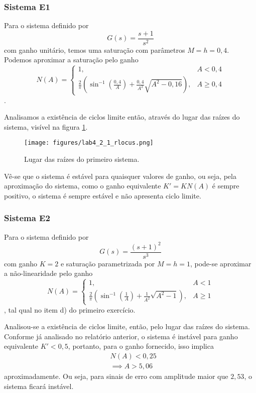\documentclass[a4paper]{report}
\begin{document}

\subsubsection*{Sistema E1}

Para o sistema definido por \[
    G(s) = \frac{s+1}{s^2}
\] com ganho unitário, temos uma saturação com parâmetros $M=h=0,4$. Podemos aproximar a saturação pelo ganho \[
    N(A) = \begin{cases}
	1,& A<0,4 \\
	\frac{2}{\pi}\left( \sin^{-1}\left( \frac{0,4}{A} \right) + \frac{0,4}{A^2}\sqrt{A^2 - 0,16}  \right),& A\ge 0,4
    \end{cases}
\].

Analisamos a existência de ciclos limite então, através do lugar das raízes do sistema, visível na figura \ref{fig:figures-lab4_2_1_rlocus-png}.

\begin{figure}[H]
    \centering
    \texttt{[image: figures/lab4\_2\_1\_rlocus.png]}
    \caption{Lugar das raízes do primeiro sistema.}
    \label{fig:figures-lab4_2_1_rlocus-png}
\end{figure}

Vê-se que o sistema é estável para quaisquer valores de ganho, ou seja, pela aproximação do sistema, como o ganho equivalente $K' = KN(A)$ é sempre positivo, o sistema é sempre estável e não apresenta ciclo limite.

\subsubsection*{Sistema E2}

Para o sistema definido por \[
    G(s) = \frac{(s+1)^{2}}{s^{3}}
\] com ganho $K=2$ e saturação parametrizada por $M=h=1$, pode-se aproximar a não-linearidade pelo ganho \[
    N(A) = \begin{cases}
	1,& A<1 \\
	\frac{2}{\pi}\left( \sin^{-1}\left( \frac{1}{A} \right) + \frac{1}{A^2}\sqrt{A^2 - 1}  \right),& A\ge 1
    \end{cases}
\], tal qual no item d) do primeiro exercício.

Analisou-se a existência de ciclos limite, então, pelo lugar das raízes do sistema. Conforme já analisado no relatório anterior, o sistema é instável para ganho equivalente $K' < 0,5$, portanto, para o ganho fornecido, isso implica
\begin{align*}
    &N(A) < 0,25 \\
    &\implies A > 5,06
\end{align*}
aproximadamente. Ou seja, para sinais de erro com amplitude maior que $2,53$, o sistema ficará instável.
\end{document}
